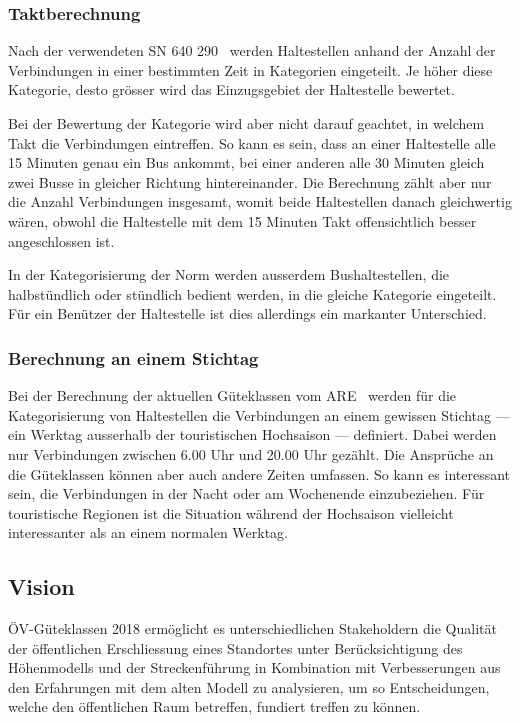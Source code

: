 \subsubsection{Taktberechnung}
\label{problem:Taktberechnung}

Nach der verwendeten \acs{SN} 640 290~\cite{sn640290} werden Haltestellen anhand der Anzahl der Verbindungen in einer bestimmten Zeit in Kategorien eingeteilt.
Je höher diese Kategorie, desto grösser wird das Einzugsgebiet der Haltestelle bewertet.

Bei der Bewertung der Kategorie wird aber nicht darauf geachtet, in welchem Takt die Verbindungen eintreffen.
So kann es sein, dass an einer Haltestelle alle 15 Minuten genau ein Bus ankommt, bei einer anderen alle 30 Minuten gleich zwei Busse in gleicher Richtung hintereinander.
Die Berechnung zählt aber nur die Anzahl Verbindungen insgesamt, womit beide Haltestellen danach gleichwertig wären, obwohl die Haltestelle mit dem 15 Minuten Takt offensichtlich besser angeschlossen ist.

In der Kategorisierung der Norm werden ausserdem Bushaltestellen, die halbstündlich oder stündlich bedient werden, in die gleiche Kategorie eingeteilt.
Für ein Benützer der Haltestelle ist dies allerdings ein markanter Unterschied.

\subsubsection{Berechnung an einem Stichtag}
\label{problem:Berechnung an einem Stichtag}

Bei der Berechnung der aktuellen Güteklassen vom \ac{ARE}~\cite{berechnung_are} werden für die Kategorisierung von Haltestellen die Verbindungen an einem gewissen Stichtag --- ein Werktag ausserhalb der touristischen Hochsaison --- definiert.
Dabei werden nur Verbindungen zwischen 6.00 Uhr und 20.00 Uhr gezählt.
Die Ansprüche an die Güteklassen können aber auch andere Zeiten umfassen.
So kann es interessant sein, die Verbindungen in der Nacht oder am Wochenende einzubeziehen.
Für touristische Regionen ist die Situation während der Hochsaison vielleicht interessanter als an einem normalen Werktag.

\subsection{Vision}
\label{Einführung:Vision}

\acs{ÖV}-Güteklassen 2018 ermöglicht es unterschiedlichen Stakeholdern die Qualität der öffentlichen Erschliessung eines Standortes unter Berücksichtigung des Höhenmodells und der Streckenführung in Kombination mit Verbesserungen aus den Erfahrungen mit dem alten Modell zu analysieren, um so Entscheidungen, welche den öffentlichen Raum betreffen, fundiert treffen zu können.


